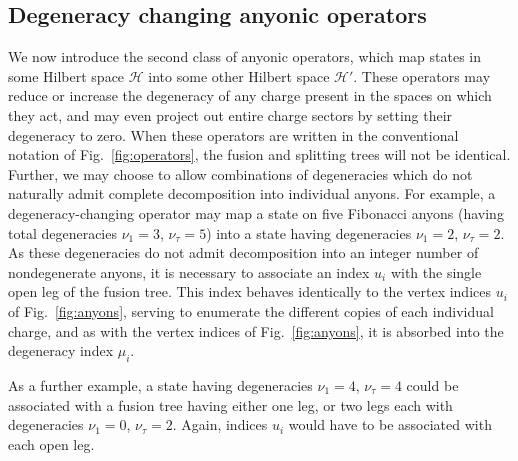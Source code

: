 \documentclass[aps,prb,reprint,superscriptaddress,amsfonts,amsmath,amssymb,showpacs,floatfix]{revtex4-1}
\newcommand{\mc}[1]{\mathcal{#1}}
\newcommand{\fref}[1]{Fig.~\ref{#1}}
\newcommand{\sref}[1]{Sec.~\ref{#1}}
\begin{document}


\subsection{Degeneracy changing anyonic operators\label{sec:degenexp}}

We now introduce the second class of anyonic operators, which map states in some Hilbert space $\mc{H}$ into some other Hilbert space $\mc{H}'$. These operators may reduce or increase the degeneracy of any charge present in the spaces on which they act, and may even project out entire charge sectors by setting their degeneracy to zero.
When these operators are written in the conventional notation of \fref{fig:operators}, the fusion and splitting trees will not be identical. Further, we may choose to allow combinations of degeneracies which do not naturally admit complete decomposition into individual anyons. For example, a degeneracy-changing operator may map a state on five Fibonacci anyons (having total degeneracies $\nu_1=3$, $\nu_\tau=5$) into a state having degeneracies $\nu_1=2$, $\nu_\tau=2$. As these degeneracies do not admit decomposition into an integer number of nondegenerate anyons, it is necessary %
to associate an index $u_i$ with the single open leg of the fusion tree. This index behaves identically to the vertex indices $u_i$ of \fref{fig:anyons}, serving to enumerate the different copies of each individual charge, and as with the vertex indices of \fref{fig:anyons}, it is absorbed into the degeneracy index $\mu_i$.

As a further example, a state having degeneracies $\nu_1=4$, $\nu_\tau=4$ could be associated with a fusion tree having either one leg, or two legs each with degeneracies $\nu_1=0$, $\nu_\tau=2$. Again, indices $u_i$ would have to be associated with each open leg.
\end{document}
